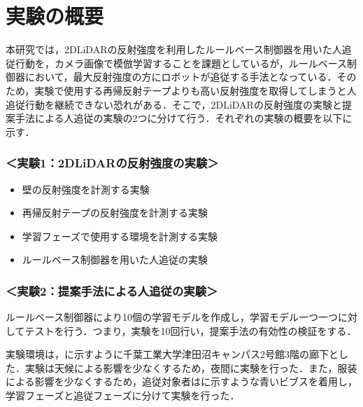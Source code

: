
\section{実験の概要}

  本研究では，2DLiDARの反射強度を利用したルールベース制御器を用いた人追従行動を，カメラ画像で模倣学習することを課題としているが，ルールベース制御器において，最大反射強度の方にロボットが追従する手法となっている．そのため，実験で使用する再帰反射テープよりも高い反射強度を取得してしまうと人追従行動を継続できない恐れがある．そこで，2DLiDARの反射強度の実験と提案手法による人追従の実験の2つに分けて行う．それぞれの実験の概要を以下に示す．

  \subsubsection*{＜実験1：2DLiDARの反射強度の実験＞}
  \begin{itemize}
    \item 壁の反射強度を計測する実験
    \item 再帰反射テープの反射強度を計測する実験
    \item 学習フェーズで使用する環境を計測する実験
    \item ルールベース制御器を用いた人追従の実験
  \end{itemize}
  
\newpage

  \subsubsection*{＜実験2：提案手法による人追従の実験＞}
  ルールベース制御器により10個の学習モデルを作成し，学習モデル一つ一つに対してテストを行う．つまり，実験を10回行い，提案手法の有効性の検証をする．

  \vspace{1cm}

  実験環境は，に示すように千葉工業大学津田沼キャンパス2号館3階の廊下とした．実験は天候による影響を少なくするため，夜間に実験を行った．また，服装による影響を少なくするため，追従対象者はに示すような青いビブスを着用し，学習フェーズと追従フェーズに分けて実験を行った．

